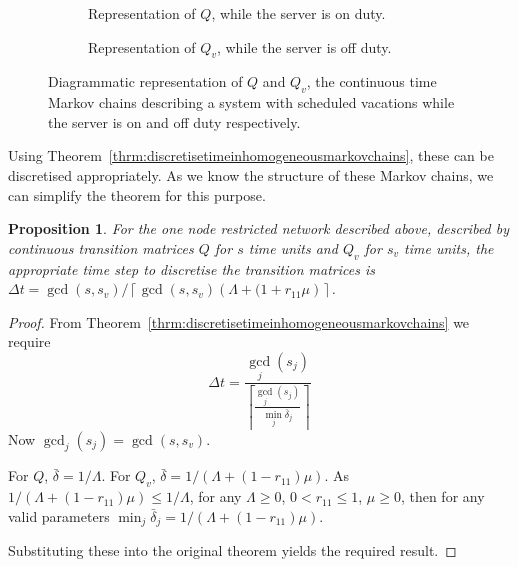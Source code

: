 \documentclass{article}
\newtheorem{proposition}{Proposition}
\begin{document}
\begin{figure}
\begin{subfigure}[b]{\textwidth}
    
    \caption{Representation of $Q$, while the server is on duty.}
    \vspace{3cm}
    \label{fig:MCSVonduty}
\end{subfigure}
\begin{subfigure}[b]{\textwidth}
    
    \caption{Representation of $Q_v$, while the server is off duty.}
    \label{fig:MCSVoffduty}
\end{subfigure}
\caption{Diagrammatic representation of $Q$ and $Q_v$, the continuous time Markov chains describing a system with scheduled vacations while the server is on and off duty respectively.}
\label{fig:scheduledvacationsMC}
\end{figure}




Using Theorem~\ref{thrm:discretisetimeinhomogeneousmarkovchains}, these can be discretised appropriately.
As we know the structure of these Markov chains, we can simplify the theorem for this purpose.
\newline

\begin{proposition}
For the one node restricted network described above, described by continuous transition matrices $Q$ for $s$ time units and $Q_v$ for $s_v$ time units, the appropriate time step to discretise the transition matrices is $\Delta t = \gcd(s, s_v) / \left\lceil \gcd(s, s_v) \left(\Lambda + (1 + r_{11}\mu\right) \right\rceil$.
\end{proposition}

\begin{proof}
From Theorem~\ref{thrm:discretisetimeinhomogeneousmarkovchains} we require
\begin{equation*}
\Delta t = \frac{\gcd_j(s_j)}{\left\lceil \frac{\gcd_j(s_j)}{\min_j \bar{\delta}_j} \right\rceil}
\end{equation*}
Now $\gcd_j(s_j) = \gcd(s, s_v)$.

For $Q$, $\bar{\delta} = 1 / \Lambda$.
For $Q_v$, $\bar{\delta} = 1 /(\Lambda + (1 - r_{11})\mu)$.
As $1 /(\Lambda + (1 - r_{11})\mu) \leq 1 / \Lambda$, for any $\Lambda \geq 0$, $0 < r_{11} \leq 1$, $\mu \geq 0$, then for any valid parameters $\min_j \bar{\delta}_j = 1 /(\Lambda + (1 - r_{11})\mu)$.

Substituting these into the original theorem yields the required result.
\end{proof}
\end{document}
